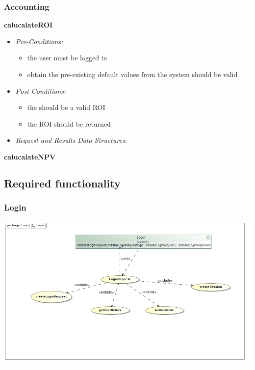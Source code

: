\documentclass[a4paper,12pt]{article}
\begin{document}
\subsubsection{Accounting}
\textbf{{calucalateROI}}
	\begin{itemize}
		\item \textit{Pre-Conditions:}
		\begin{itemize}
		\item the user must be logged in
		\item obtain the pre-existing default values from the system should be valid
		\end{itemize}
		\item \textit{Post-Conditions:}
		\begin{itemize}
		\item the should be a valid ROI
		\item the ROI should be returned 
		\end{itemize}
		\item \textit{Request and Results Data Structures:}
	\end{itemize}
\textbf{{calucalateNPV}}

\subsection{Required functionality}
\subsubsection{Login}
\includegraphics[width=1\textwidth]{./Images/processSpecification/Priscilla/Login.jpg}
\end{document}
